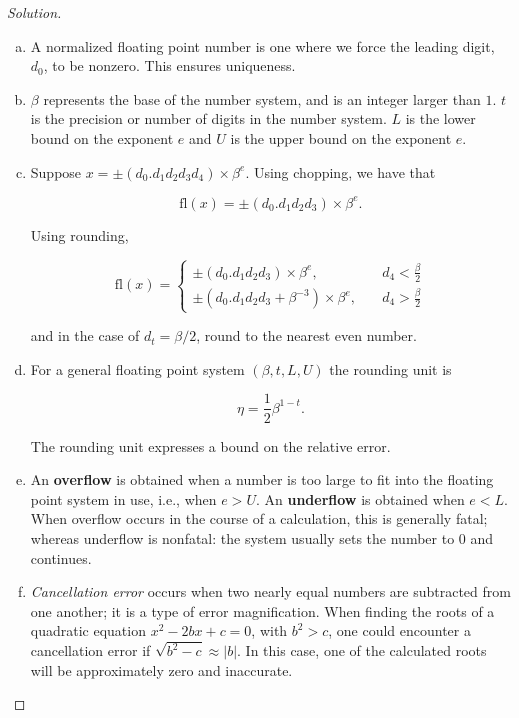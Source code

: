 \documentclass[12pt,a4]{article}
\theoremstyle{definition}
\begin{document}
\begin{proof}[Solution]
	\begin{enumerate}[(a)]
		\item A normalized floating point number is one where we force the leading digit, $d_0$, to be nonzero. This ensures uniqueness. 
		
		\item $\beta$ represents the base of the number system, and is an integer larger than $1$. $t$ is the precision or number of digits in the number system. $L$ is the lower bound on the exponent $e$ and $U$ is the upper bound on the exponent $e$.
		
		\item Suppose $x = \pm(d_0.d_1 d_2 d_3 d_4) \times \beta^e$. Using chopping, we have that 
		
		\[
		\text{fl}(x) = \pm (d_0.d_1 d_2 d_3) \times \beta^e {.}
		\]
		
		\noindent Using rounding, 
		
		\[
		\text{fl}(x) = \begin{cases}
		\pm (d_0.d_1 d_2 d_3) \times \beta^e {,} &\quad d_4 < \frac{\beta}{2} \\
		\pm (d_0.d_1 d_2 d_3 + \beta^{-3}) \times \beta^e {,} &\quad d_4 > \frac{\beta}{2} 
		\end{cases}
		\]
		
		and in the case of $d_t = \beta / 2$, round to the nearest even number. 
		
		\item For a general floating point system $(\beta, t , L, U)$ the rounding unit is 
		
		\[
		\eta = \frac{1}{2} \beta^{1 - t} {.}
		\]
		
		\noindent The rounding unit expresses a bound on the relative error. 
		
		\item An \textbf{overflow} is obtained when a number is too large to fit into the floating point system in use, i.e., when $e > U$. An \textbf{underflow} is obtained when $e < L$. When overflow occurs in the course of a calculation, this is generally fatal; whereas underflow is nonfatal: the system usually sets the number to 0 and continues. 
		
		\item \emph{Cancellation error} occurs when two nearly equal numbers are subtracted from one another; it is a type of error magnification. When finding the roots of a quadratic equation $x^2 - 2 b x + c = 0$, with $b^2 > c$, one could encounter a cancellation error if $\sqrt{b^2 - c} \approx |b|$. In this case, one of the calculated roots will be approximately zero and inaccurate.
		

\end{enumerate}
\end{proof}
\end{document}

